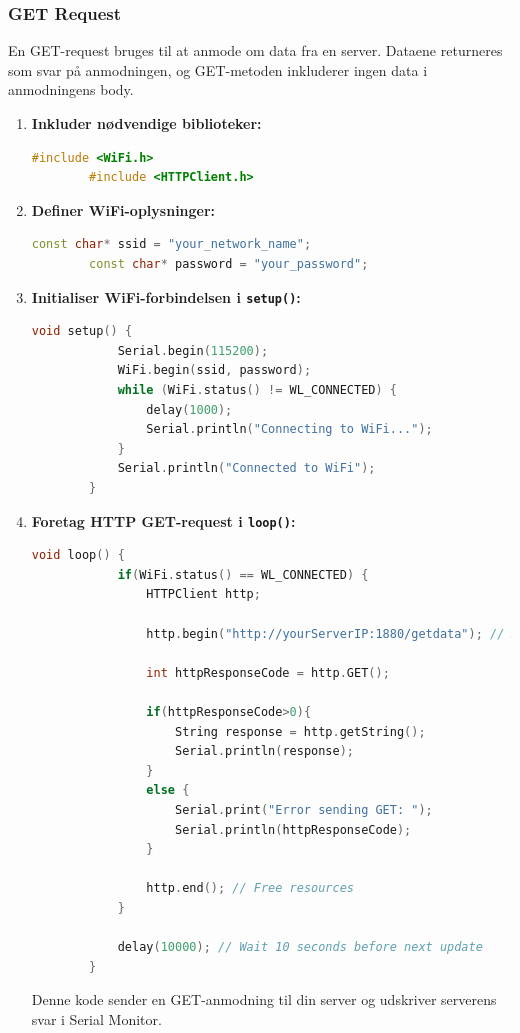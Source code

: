 \subsubsection*{GET Request}
En GET-request bruges til at anmode om data fra en server. Dataene returneres som svar på anmodningen, og GET-metoden inkluderer ingen data i anmodningens body.

\begin{enumerate}
	\item \textbf{Inkluder nødvendige biblioteker:}
	\begin{lstlisting}[language=C++, caption=Include necessary libraries]
		#include <WiFi.h>
		#include <HTTPClient.h>
	\end{lstlisting}
	
	\item \textbf{Definer WiFi-oplysninger:}
	\begin{lstlisting}[language=C++, caption=Define WiFi credentials]
		const char* ssid = "your_network_name";
		const char* password = "your_password";
	\end{lstlisting}
	
	\item \textbf{Initialiser WiFi-forbindelsen i \texttt{setup()}:}
	\begin{lstlisting}[language=C++, caption=Initialize WiFi connection in setup()]
		void setup() {
			Serial.begin(115200);
			WiFi.begin(ssid, password);
			while (WiFi.status() != WL_CONNECTED) {
				delay(1000);
				Serial.println("Connecting to WiFi...");
			}
			Serial.println("Connected to WiFi");
		}
	\end{lstlisting}
	
	\item \textbf{Foretag HTTP GET-request i \texttt{loop()}:}
	\begin{lstlisting}[language=C++, caption=Create HTTP connection in loop()]
		void loop() {
			if(WiFi.status() == WL_CONNECTED) {
				HTTPClient http;
				
				http.begin("http://yourServerIP:1880/getdata"); // Specify the URL
				
				int httpResponseCode = http.GET();
				
				if(httpResponseCode>0){
					String response = http.getString();
					Serial.println(response);
				}
				else {
					Serial.print("Error sending GET: ");
					Serial.println(httpResponseCode);
				}
				
				http.end(); // Free resources
			}
			
			delay(10000); // Wait 10 seconds before next update
		}
	\end{lstlisting}
	Denne kode sender en GET-anmodning til din server og udskriver serverens svar i Serial Monitor.
\end{enumerate}

